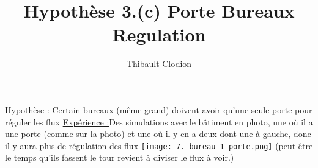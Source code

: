 \documentclass[12pt]{article}
\title{Hypothèse 3.(c) Porte Bureaux Regulation}
\author{Thibault Clodion}
\begin{document}
\maketitle %

\underline{Hypothèse :} Certain bureaux (même grand) doivent avoir qu'une seule porte pour réguler les flux
\newline\newline
\underline{Expérience :}Des simulations avec le bâtiment en photo, une où il a une porte (comme sur la photo) et une où il y en a deux dont une à gauche, donc il y aura plus de régulation des flux
\newline\texttt{[image: 7. bureau 1 porte.png]}\newline
\newline
(peut-être le temps qu'ils fassent le tour revient à diviser le flux à voir.)
\newline\newline
\end{document}
